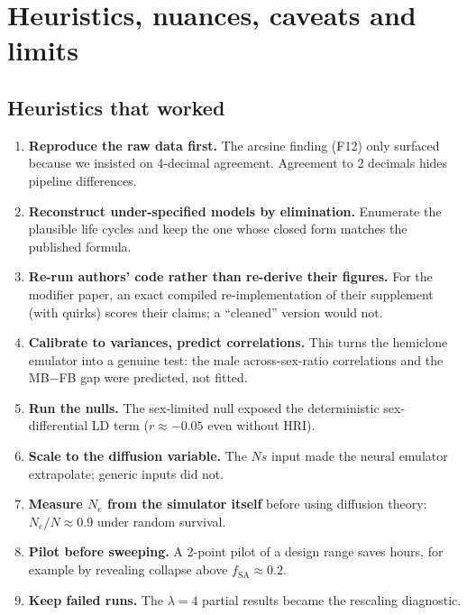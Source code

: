 \chapter{Heuristics, nuances, caveats and limits}\label{ch:heur}

\section{Heuristics that worked}
\begin{enumerate}
\item \textbf{Reproduce the raw data first.} The arcsine finding (F12) only surfaced because we insisted on 4-decimal agreement. Agreement to 2 decimals hides pipeline differences.
\item \textbf{Reconstruct under-specified models by elimination.} Enumerate the plausible life cycles and keep the one whose closed form matches the published formula.
\item \textbf{Re-run authors' code rather than re-derive their figures.} For the modifier paper, an exact compiled re-implementation of their supplement (with quirks) scores their claims; a ``cleaned'' version would not.
\item \textbf{Calibrate to variances, predict correlations.} This turns the hemiclone emulator into a genuine test: the male across-sex-ratio correlations and the MB$-$FB gap were predicted, not fitted.
\item \textbf{Run the nulls.} The sex-limited null exposed the deterministic sex-differential LD term ($r\approx-0.05$ even without HRI).
\item \textbf{Scale to the diffusion variable.} The $Ns$ input made the neural emulator extrapolate; generic inputs did not.
\item \textbf{Measure $N_e$ from the simulator itself} before using diffusion theory: $N_e/N\approx0.9$ under random survival.
\item \textbf{Pilot before sweeping.} A 2-point pilot of a design range saves hours, for example by revealing collapse above $f_\mathrm{SA}\approx0.2$.
\item \textbf{Keep failed runs.} The $\lambda=4$ partial results became the rescaling diagnostic.
\end{enumerate}

